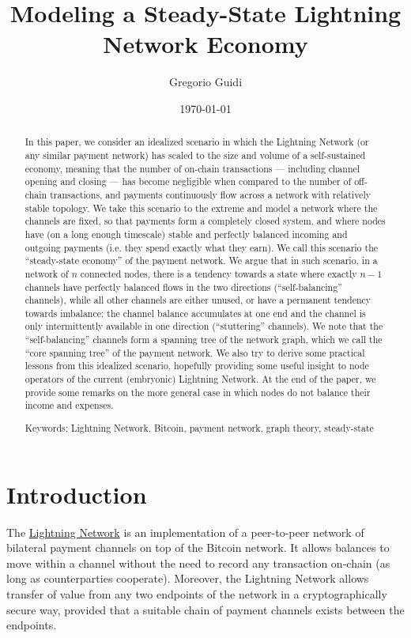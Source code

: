 \documentclass[a4paper]{article}
\begin{document}
\title{Modeling a Steady-State Lightning Network Economy}
\author{Gregorio Guidi}
\date{\today}

\maketitle

\begin{abstract}
In this paper, we consider an idealized scenario in which the Lightning Network (or any similar payment network) has scaled to the size and volume of a self-sustained economy, meaning that the number of on-chain transactions --- including channel opening and closing --- has become negligible when compared to the number of off-chain transactions, and payments continuously flow across a network with relatively stable topology. We take this scenario to the extreme and model a network where the channels are fixed, so that payments form a completely closed system, and where nodes have (on a long enough timescale) stable and perfectly balanced incoming and outgoing payments (i.e. they spend exactly what they earn). We call this scenario the ``steady-state economy'' of the payment network.
We argue that in such scenario, in a network of $n$ connected nodes, there is a tendency towards a state where exactly $n-1$ channels have perfectly balanced flows in the two directions (``self-balancing'' channels), while all other channels are either unused, or have a permanent tendency towards imbalance: the channel balance accumulates at one end and the channel is only intermittently available in one direction (``stuttering'' channels). We note that the ``self-balancing'' channels form a spanning tree of the network graph, which we call the ``core spanning tree'' of the payment network.
We also try to derive some practical lessons from this idealized scenario, hopefully providing some useful insight to node operators of the current (embryonic) Lightning Network.
At the end of the paper, we provide some remarks on the more general case in which nodes do not balance their income and expenses.

Keywords: Lightning Network, Bitcoin, payment network, graph theory, steady-state
\end{abstract}

\section{Introduction}\label{sec_introduction}

The \href{https://en.wikipedia.org/wiki/Lightning_Network}{Lightning Network} is an implementation of a peer-to-peer network of bilateral payment channels on top of the Bitcoin network. It allows balances to move within a channel without the need to record any transaction on-chain (as long as counterparties cooperate). Moreover, the Lightning Network allows transfer of value from any two endpoints of the network in a cryptographically secure way, provided that a suitable chain of payment channels exists between the endpoints.
\end{document}
